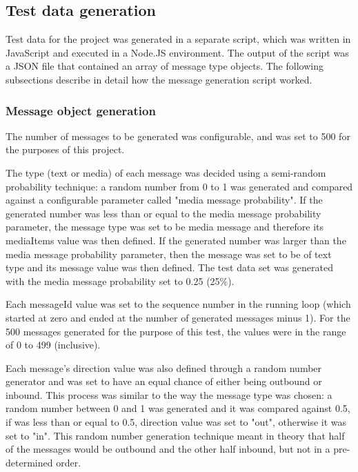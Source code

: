 \documentclass[a4paper,12pt]{article}
\begin{document}
\subsection{Test data generation}
\label{subsec:test-data-generation}
Test data for the project was generated in a separate script, which was written in JavaScript and executed in a Node.JS environment. The output of the script was a JSON file that contained an array of message type objects. The following subsections describe in detail how the message generation script worked.

\subsubsection{Message object generation}
The number of messages to be generated was configurable, and was set to 500 for the purposes of this project.

The type (text or media) of each message was decided using a semi-random probability technique: a random number from 0 to 1 was generated and compared against a configurable parameter called "media message probability". If the generated number was less than or equal to the media message probability parameter, the message type was set to be media message and therefore its mediaItems value was then defined. If the generated number was larger than the media message probability parameter, then the message was set to be of text type and its message value was then defined. The test data set was generated with the media message probability set to 0.25 (25\%).

Each messageId value was set to the sequence number in the running loop (which started at zero and ended at the number of generated messages minus 1). For the 500 messages generated for the purpose of this test, the values were in the range of 0 to 499 (inclusive).

Each message's direction value was also defined through a random number generator and was set to have an equal chance of either being outbound or inbound. This process was similar to the way the message type was chosen: a random number between 0 and 1 was generated and it was compared against 0.5, if was less than or equal to 0.5, direction value was set to "out", otherwise it was set to "in". This random number generation technique meant in theory that half of the messages would be outbound and the other half inbound, but not in a pre-determined order.
\end{document}
